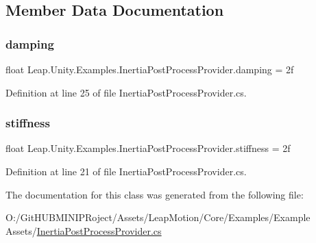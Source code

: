 \subsection{Member Data Documentation}
\mbox{\label{class_leap_1_1_unity_1_1_examples_1_1_inertia_post_process_provider_a4c1323ad732c8cec8de2c90239b6de60}} 
\subsubsection{\texorpdfstring{damping}{damping}}
{\footnotesize\ttfamily float Leap.\+Unity.\+Examples.\+Inertia\+Post\+Process\+Provider.\+damping = 2f}



Definition at line 25 of file Inertia\+Post\+Process\+Provider.\+cs.

\mbox{\label{class_leap_1_1_unity_1_1_examples_1_1_inertia_post_process_provider_a5ec6ca4a850850dcffdae36d74e75e6e}} 
\subsubsection{\texorpdfstring{stiffness}{stiffness}}
{\footnotesize\ttfamily float Leap.\+Unity.\+Examples.\+Inertia\+Post\+Process\+Provider.\+stiffness = 2f}



Definition at line 21 of file Inertia\+Post\+Process\+Provider.\+cs.



The documentation for this class was generated from the following file\+:\begin{DoxyCompactItemize}
\item 
O\+:/\+Git\+H\+U\+B\+M\+I\+N\+I\+P\+Roject/\+Assets/\+Leap\+Motion/\+Core/\+Examples/\+Example Assets/\mbox{\hyperlink{_inertia_post_process_provider_8cs}{Inertia\+Post\+Process\+Provider.\+cs}}\end{DoxyCompactItemize}
